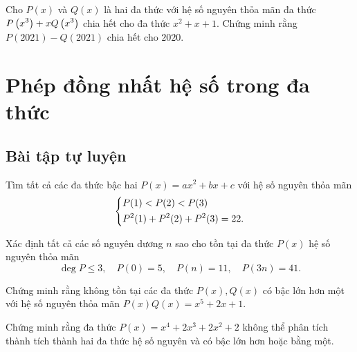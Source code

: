 \begin{gbtt}
Cho $P(x)$ và $Q(x)$ là hai đa thức với hệ số nguyên thỏa mãn đa thức $P\left(\displaystyle x^3 \right)+xQ\left(\displaystyle x^3 \right)$ chia hết cho đa thức $x^2+x+1.$ Chứng minh rằng $P(2021)-Q(2021)$ chia hết cho $2020.$
\end{gbtt}

\section{Phép đồng nhất hệ số trong đa thức}

\subsection*{Bài tập tự luyện}

\begin{btt}
Tìm tất cả các đa thức bậc hai $P(x)=a x^{2}+b x+c$ với hệ số nguyên thỏa mãn 
$$\left\{\begin{aligned}&P(1)<P(2)<P(3) \\ &P^2(1)+P^2(2)+P^2(3)=22.\end{aligned}\right.$$
\end{btt}

\begin{btt}
Xác định tất cả các số nguyên dương $n$ sao cho tồn tại đa thức $P(x)$ hệ số nguyên thỏa mãn
\[\deg P\le 3,\quad P(0)=5,\quad P(n)=11,\quad P(3n)=41.\]
\end{btt}

\begin{btt}
Chứng minh rằng không tồn tại các đa thức $P(x),Q(x)$ có bậc lớn hơn một với hệ số nguyên thỏa mãn $P(x)Q(x)=x^5+2x+1.$
\end{btt}

\begin{btt}
Chứng minh rằng đa thức $P(x)=x^4+2x^3+2x^2+2$ không thể phân tích thành tích thành hai đa thức hệ số nguyên và có bậc lớn hơn hoặc bằng một.
\end{btt}

